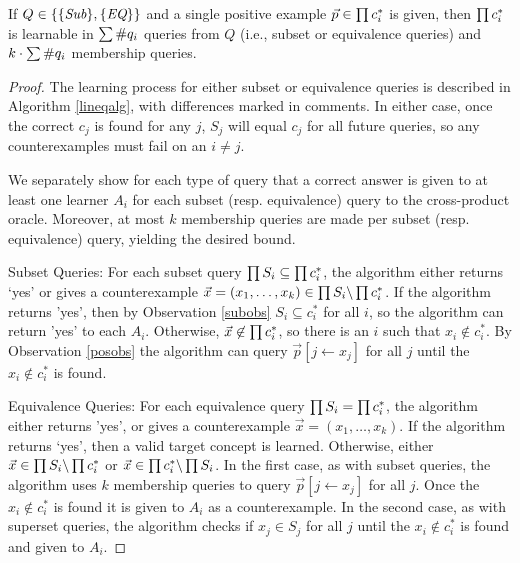 \begin{proposition}
If $Q \in \{\{\emph{Sub}\}, \{\emph{EQ}\}\}$ and a single positive example $\vec{p} \in \prod c^*_i$ is given, then $\prod c^*_i$ is learnable in $\sum \#q_{i}$ queries from $Q$ (i.e., subset or equivalence queries) and $k \cdot \sum \#q_{i}$ membership queries. 
\end{proposition}
\begin{proof}
The learning process for either subset or equivalence queries is described in Algorithm \ref{lineqalg}, with differences marked in comments. 
In either case, once the correct $c_j$ is found for any $j$, $S_j$ will equal $c_j$ for all future queries, so any counterexamples must fail on an $i \ne j$. 

We separately show for each type of query that a correct answer is given to at least one learner $A_i$ for each subset (resp. equivalence) query to the cross-product oracle. 
Moreover, at most $k$ membership queries are made per subset (resp. equivalence) query, yielding the desired bound. 

Subset Queries:
For each subset query $\prod S_i \subseteq \prod c^*_i$, the algorithm either returns `yes' or gives a counterexample $\vec{x} = (x_1, \dots, x_k) \in \prod S_i \backslash \prod c^*_i$. 
If the algorithm returns 'yes', then by Observation \ref{subobs} $S_i \subseteq c^*_i$ for all $i$, so the algorithm can return 'yes' to each $A_i$. 
Otherwise, $\vec{x} \not\in \prod c^*_i$, so there is an $i$ such that $x_i \not\in c^*_i$. 
By Observation \ref{posobs} the algorithm can query $\vec{p}[j \leftarrow x_j]$ for all $j$ until the $x_i \not\in c^*_i$ is found. 

Equivalence Queries:
For each equivalence query $\prod S_i = \prod c^*_i$, the algorithm either returns 'yes', or gives a counterexample $\vec{x} = (x_1, \dots, x_k)$.
If the algorithm returns `yes', then a valid target concept is learned. 
Otherwise, either $\vec{x} \in \prod S_i \backslash \prod c^*_i$ or $\vec{x} \in \prod c^*_i \backslash \prod S_i$.
In the first case, as with subset queries,  the algorithm uses $k$ membership queries to query $\vec{p}[j \leftarrow x_j]$ for all $j$.
Once the $x_i \not\in c^*_i$ is found it is given to $A_i$ as a counterexample.
In the second case, as with superset queries, the algorithm checks if $x_j \in S_j$ for all $j$ until the $x_i \not\in c^*_i$ is found and given to $A_i$.
\end{proof}


